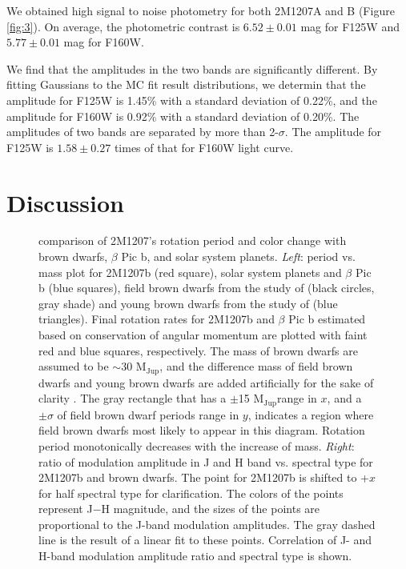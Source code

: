 \documentclass[apj]{emulateapj}
\newcommand{\bpic}{$\beta$ Pic}
\newcommand{\mjup}{M$_{\mbox{Jup}}$}
\begin{document}
We obtained high signal to noise photometry for both 2M1207A
and B (Figure \ref{fig:3}). On average, the photometric contrast is
$6.52\pm0.01$ mag for F125W and $5.77\pm0.01$ mag for F160W.



We find that the amplitudes in the two bands are
significantly different. By fitting Gaussians to the MC fit result
distributions, we determin that the  amplitude for F125W is
1.45\% with a standard deviation of 0.22\%, and  the amplitude for F160W is
0.92\% with a standard deviation of 0.20\%. The amplitudes of two
bands are separated by more than 2-$\sigma$. The amplitude
for F125W is $1.58\pm0.27$ times of that for F160W light curve.


\section{Discussion}
\label{sec:discussion}
\begin{figure}
  \centering
  \caption{comparison of 2M1207's rotation period and color change
    with brown dwarfs, \bpic{} b, and solar system planets. {\em
      Left}: period vs. mass plot for 2M1207b (red square), solar
    system planets and \bpic{} b (blue squares), field brown dwarfs
    from the study of \citet[][]{Metchev2015}
    (black circles, gray shade) and young brown dwarfs from the study
    of \citet{Scholz2015} (blue
    triangles). Final rotation rates for 2M1207b and \bpic{} b
    estimated based on conservation of angular momentum are plotted
    with faint red and blue squares, respectively. The mass of brown
    dwarfs are assumed to be $\sim30$ \mjup{}, and the difference mass
    of field brown dwarfs and young brown dwarfs are added
    artificially for the sake of clarity . The gray rectangle that has a
    $\pm$15
    \mjup range in $x$,
    and a $\pm \sigma$
    of field brown dwarf periods range in $y$,
    indicates a region where field brown dwarfs most likely to appear in
    this diagram. Rotation period monotonically decreases with the
    increase of mass. {\em Right}: ratio of modulation amplitude in J
    and H band vs. spectral type for 2M1207b and brown dwarfs. The
    point for 2M1207b is shifted to +$x$
    for half spectral type for clarification.  The colors of the
    points represent J$-$H
    magnitude, and the sizes of the points are proportional to the
    J-band modulation amplitudes. The gray dashed line is the result
    of a linear fit to these points.  Correlation of J- and H-band
    modulation amplitude ratio and spectral type is shown.}
 \label{fig:5}
\end{figure}
\end{document}
